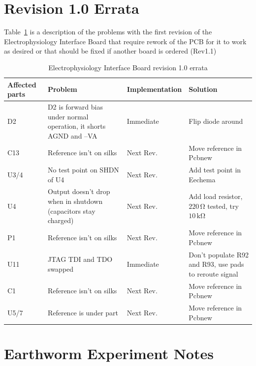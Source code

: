 \documentclass{article}
\newcommand{\unit}[1]{\ensuremath{\, \mathrm{#1}}}
\begin{document}
\section{Revision 1.0 Errata}\label{sec:errata}

Table~\ref{tab:errata} is a description of the problems with the first revision of the Electrophysiology Interface Board that require rework of the PCB for it to work as desired or that should be fixed if another board is ordered (Rev1.1)

\begin{singlespace}
\begin{center}
\begin{table}[H]
\begin{tabular}{|l|p{1.5in}|l|p{1.5in}|}
\hline	Affected parts	&Problem 	&Implementation	&Solution\\ \hline
D2	&D2 is forward bias under normal operation, it shorts AGND and {--VA}	&Immediate	&Flip diode around\\ \hline
C13	&Reference isn't on silks	&Next Rev.	&Move reference in Pcbnew\\ \hline
U3/4	&No test point on SHDN of U4	&Next Rev.	&Add test point in Eechema\\ \hline
U4	&Output doesn't drop when in shutdown (capacitors stay charged)	&Next Rev.	&Add load resistor, $220\unit{\Omega}$ tested, try $10\unit{k\Omega}$\\ \hline
P1	&Reference isn't on silks	&Next Rev.	&Move reference in Pcbnew\\ \hline
U11	&JTAG TDI and TDO swapped	&Immediate	&Don't populate R92 and R93, use pads to reroute signal\\ \hline
C1	&Reference isn't on silks	&Next Rev.	&Move reference in Pcbnew\\ \hline
U5/7	&Reference is under part	&Next Rev.	&Move reference in Pcbnew\\ \hline
\end{tabular}
\caption{Electrophysiology Interface Board revision 1.0 errata\label{tab:errata} }
\end{table}
\end{center}
\end{singlespace}

\section{Earthworm Experiment Notes}\label{sec:tips}


\end{document}
